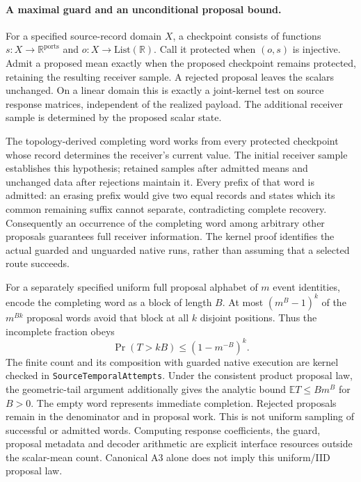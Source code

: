\paragraph{A maximal guard and an unconditional proposal bound.}
For a specified source-record domain $X$, a checkpoint consists of functions
$s:X\to\mathbb R^{\mathrm{ports}}$ and $o:X\to\mathrm{List}(\mathbb R)$.
Call it protected when $(o,s)$ is injective. Admit a proposed mean exactly
when the proposed checkpoint remains protected, retaining the resulting
receiver sample. A rejected proposal leaves the scalars unchanged. On a
linear domain this is exactly a joint-kernel test on source response
matrices, independent of the realized payload. The additional receiver
sample is determined by the proposed scalar state.

The topology-derived completing word works from every protected checkpoint
whose record determines the receiver's current value. The initial receiver
sample establishes this hypothesis; retained samples after admitted means
and unchanged data after rejections maintain it. Every prefix of that
word is admitted: an erasing prefix would give two equal records and states
which its common remaining suffix cannot separate, contradicting complete
recovery. Consequently an occurrence of the completing word among arbitrary
other proposals guarantees full receiver information. The kernel proof
identifies the actual guarded and unguarded native runs, rather than assuming
that a selected route succeeds.

For a separately specified uniform full proposal alphabet of $m$ event
identities, encode the completing word as a block of length $B$. At most
$(m^B-1)^k$ of the $m^{Bk}$ proposal words avoid that block at all $k$
disjoint positions. Thus the incomplete fraction obeys
\[
 \Pr(T>kB)\leq (1-m^{-B})^k.
\]
The finite count and its composition with guarded native execution are
kernel checked in \texttt{SourceTemporalAttempts}. Under the consistent
product proposal law, the geometric-tail argument additionally gives the
analytic bound $\mathbb E T\leq Bm^B$ for $B>0$. The empty word represents
immediate completion. Rejected proposals remain in the denominator and in
proposal work. This is not uniform sampling of successful or admitted
words. Computing response coefficients, the guard, proposal metadata and
decoder arithmetic are explicit interface resources outside the scalar-mean
count. Canonical A3 alone does not imply this uniform/IID proposal law.

